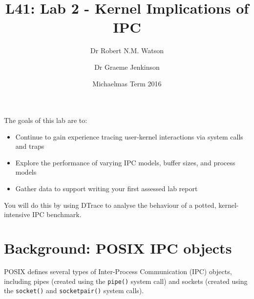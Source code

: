 \documentclass[a4paper,10pt]{article}
\begin{document}
\title{L41: Lab 2 - Kernel Implications of IPC}
\author{Dr Robert N.M. Watson
	\and
	Dr Graeme Jenkinson}
\date{Michaelmas Term 2016}
\maketitle

%
%
%

\noindent
The goals of this lab are to:

\begin{itemize}
\item Continue to gain experience tracing user-kernel interactions via system calls and traps
\item Explore the performance of varying IPC models, buffer sizes, and process models
\item Gather data to support writing your first assessed lab report
\end{itemize}

\noindent
You will do this by using DTrace to analyse the behaviour of a potted,
kernel-intensive IPC benchmark.

\section*{Background: POSIX IPC objects}

POSIX defines several types of Inter-Process Communication (IPC) objects,
including pipes (created using the \texttt{pipe()} system call) and sockets
(created using the \texttt{socket()} and \texttt{socketpair()} system calls).
\end{document}
